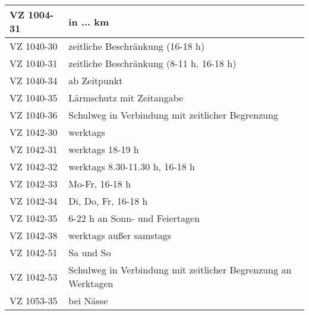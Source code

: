 \begin{appendix}
\begin{longtabu}{l X[j]}
\gls{VZ}	1004-31	& in ... km \\ \hline
\gls{VZ}	1040-30	& zeitliche Beschränkung (16-18 h) \\ \hline
\gls{VZ}	1040-31	& zeitliche Beschränkung (8-11 h, 16-18 h) \\ \hline
\gls{VZ}	1040-34	& ab Zeitpunkt \\ \hline
\gls{VZ}	1040-35	& Lärmschutz mit Zeitangabe \\ \hline
\gls{VZ}	1040-36	& Schulweg in Verbindung mit zeitlicher Begrenzung \\ \hline
\gls{VZ}	1042-30	& werktags \\ \hline
\gls{VZ}	1042-31	& werktags 18-19 h \\ \hline
\gls{VZ}	1042-32	& werktags 8.30-11.30 h, 16-18 h \\ \hline
\gls{VZ}	1042-33	& Mo-Fr, 16-18 h \\ \hline
\gls{VZ}	1042-34	& Di, Do, Fr, 16-18 h \\ \hline
\gls{VZ}	1042-35	& 6-22 h an Sonn- und Feiertagen \\ \hline
\gls{VZ}	1042-38	& werktags außer samstags \\ \hline
\gls{VZ}	1042-51	& Sa und So	\\ \hline
\gls{VZ}	1042-53	& Schulweg in Verbindung mit zeitlicher Begrenzung an Werktagen	\\ \hline
\gls{VZ}	1053-35	& bei Nässe	\\ \hline

\end{longtabu}

\printnoidxglossary[type=\acronymtype,numberedsection=autolabel] 

\end{appendix}